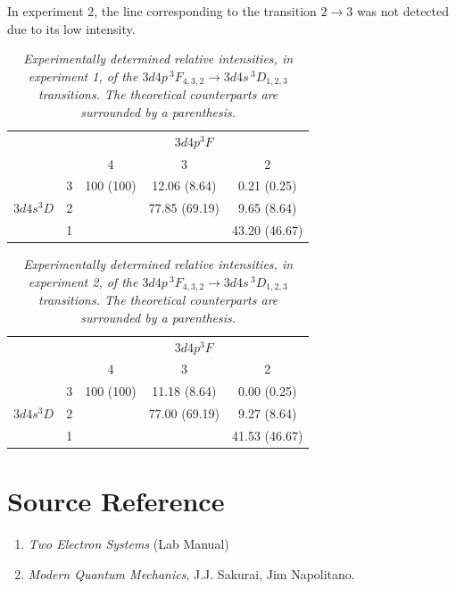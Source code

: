 \documentclass[a4paper]{article}
\begin{document}
In experiment 2, the line corresponding to the transition $2 \to 3$ was not detected due to its low intensity.

\begin{table}[htb!]
\centering
\begin{tabular}{cc|c|c|c|}
\cline{3-5}
& & \multicolumn{3}{c|}{$3d4p ^3F$}\\
\cline{3-5}
& & 4 & 3 & 2\\
\hline
\multicolumn{1}{|c|}{\multirow{3}{*}{$3d4s ^3D$}} & 3 & 100 (100) &
12.06 (8.64) & 0.21 (0.25) \\
\multicolumn{1}{|c|}{} & 2 & & 77.85 (69.19) & 9.65 (8.64)\\
\multicolumn{1}{|c|}{} & 1 & & & 43.20 (46.67) \\
\hline
\end{tabular}
\caption{\it Experimentally determined relative intensities, in experiment 1, of the
  $3d4p\,^3F_{4,3,2} \to 3d4s\,^3D_{1,2,3}$ transitions. The
  theoretical counterparts are surrounded by a parenthesis.}
\label{tab:exp-intensity21}
\end{table}

\begin{table}[htb!]
\centering
\begin{tabular}{cc|c|c|c|}
\cline{3-5}
& & \multicolumn{3}{c|}{$3d4p ^3F$}\\
\cline{3-5}
& & 4 & 3 & 2\\
\hline
\multicolumn{1}{|c|}{\multirow{3}{*}{$3d4s ^3D$}} & 3 & 100 (100) &
11.18 (8.64) & 0.00 (0.25) \\
\multicolumn{1}{|c|}{} & 2 & & 77.00 (69.19) & 9.27 (8.64)\\
\multicolumn{1}{|c|}{} & 1 & & & 41.53 (46.67) \\
\hline
\end{tabular}
\caption{\it Experimentally determined relative intensities, in experiment 2, of the
  $3d4p\,^3F_{4,3,2} \to 3d4s\,^3D_{1,2,3}$ transitions. The
  theoretical counterparts are surrounded by a parenthesis.}
\label{tab:exp-intensity22} 
\end{table}

\section{Source Reference} 

\begin{enumerate}
\item \textit{Two Electron Systems} (Lab Manual)
\item \textit{Modern Quantum Mechanics}, J.J. Sakurai, Jim Napolitano. 
\end{enumerate}
\end{document}
